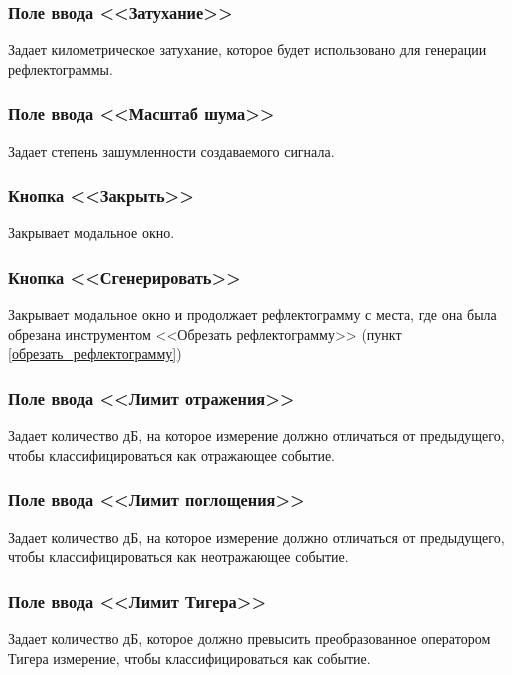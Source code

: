 \subsubsection{Поле ввода <<Затухание>>}

Задает километрическое затухание, которое будет использовано для генерации рефлектограммы.

\subsubsection{Поле ввода <<Масштаб шума>>}

Задает степень зашумленности создаваемого сигнала.

\subsubsection{Кнопка <<Закрыть>>}

Закрывает \gls{модальное окно}.

\subsubsection{Кнопка <<Сгенерировать>>}
\label{сгенерировать}

Закрывает \gls{модальное окно} и продолжает рефлектограмму с места, где она была обрезана инструментом <<Обрезать рефлектограмму>> (пункт \ref{обрезать_рефлектограмму})

\subsubsection{Поле ввода <<Лимит отражения>>}

Задает количество дБ, на которое измерение должно отличаться от предыдущего, чтобы классифицироваться как отражающее событие.

\subsubsection{Поле ввода <<Лимит поглощения>>}

Задает количество дБ, на которое измерение должно отличаться от предыдущего, чтобы классифицироваться как неотражающее событие.

\subsubsection{Поле ввода <<Лимит Тигера>>}

Задает количество дБ, которое должно превысить преобразованное оператором Тигера измерение, чтобы классифицироваться как событие.

